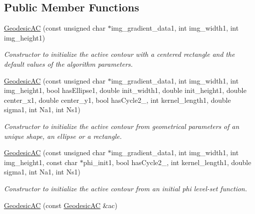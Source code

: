 \subsection*{Public Member Functions}
\begin{DoxyCompactItemize}
\item 
\hypertarget{classofeli_1_1_geodesic_a_c_af7619ec4bd4c8b3a27e764054cbb5a57}{\hyperlink{classofeli_1_1_geodesic_a_c_af7619ec4bd4c8b3a27e764054cbb5a57}{Geodesic\-A\-C} (const unsigned char $\ast$img\-\_\-gradient\-\_\-data1, int img\-\_\-width1, int img\-\_\-height1)}\label{classofeli_1_1_geodesic_a_c_af7619ec4bd4c8b3a27e764054cbb5a57}

\begin{DoxyCompactList}\small\item\em Constructor to initialize the active contour with a centered rectangle and the default values of the algorithm parameters. \end{DoxyCompactList}\item 
\hyperlink{classofeli_1_1_geodesic_a_c_a460a9d62432ff49865c00e028b994252}{Geodesic\-A\-C} (const unsigned char $\ast$img\-\_\-gradient\-\_\-data1, int img\-\_\-width1, int img\-\_\-height1, bool has\-Ellipse1, double init\-\_\-width1, double init\-\_\-height1, double center\-\_\-x1, double center\-\_\-y1, bool has\-Cycle2\-\_, int kernel\-\_\-length1, double sigma1, int Na1, int Ns1)
\begin{DoxyCompactList}\small\item\em Constructor to initialize the active contour from geometrical parameters of an unique shape, an ellipse or a rectangle. \end{DoxyCompactList}\item 
\hyperlink{classofeli_1_1_geodesic_a_c_a69faf0df5a2e9c8ce8128946bfb72653}{Geodesic\-A\-C} (const unsigned char $\ast$img\-\_\-gradient\-\_\-data1, int img\-\_\-width1, int img\-\_\-height1, const char $\ast$phi\-\_\-init1, bool has\-Cycle2\-\_, int kernel\-\_\-length1, double sigma1, int Na1, int Ns1)
\begin{DoxyCompactList}\small\item\em Constructor to initialize the active contour from an initial phi level-\/set function. \end{DoxyCompactList}\item 
\hypertarget{classofeli_1_1_geodesic_a_c_af032dd46aec5735443cae0e04c2ea37a}{\hyperlink{classofeli_1_1_geodesic_a_c_af032dd46aec5735443cae0e04c2ea37a}{Geodesic\-A\-C} (const \hyperlink{classofeli_1_1_geodesic_a_c}{Geodesic\-A\-C} \&ac)}\label{classofeli_1_1_geodesic_a_c_af032dd46aec5735443cae0e04c2ea37a}


\end{DoxyCompactItemize}
